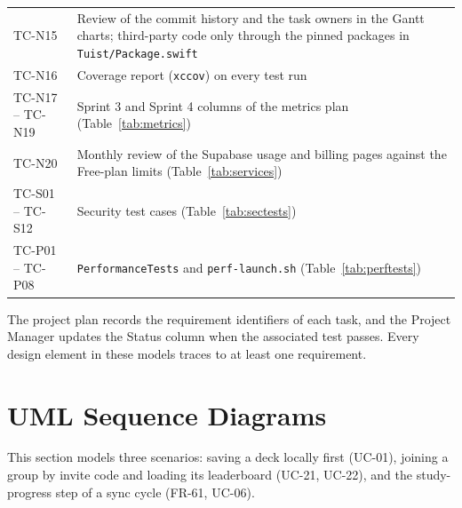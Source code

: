 \documentclass[12pt,letterpaper]{article}
\begin{document}
\begin{xltabular}{\textwidth}{@{}L{2.4cm} Y@{}}
TC-N15 & Review of the commit history and the task owners in the Gantt charts; third-party code only through the pinned packages in \texttt{Tuist/Package.swift} \\
TC-N16 & Coverage report (\texttt{xccov}) on every test run \\
TC-N17 -- TC-N19 & Sprint 3 and Sprint 4 columns of the metrics plan (Table~\ref{tab:metrics}) \\
TC-N20 & Monthly review of the Supabase usage and billing pages against the Free-plan limits (Table~\ref{tab:services}) \\
TC-S01 -- TC-S12 & Security test cases (Table~\ref{tab:sectests}) \\
TC-P01 -- TC-P08 & \texttt{PerformanceTests} and \texttt{perf-launch.sh} (Table~\ref{tab:perftests}) \\
\end{xltabular}

The project plan records the requirement identifiers of each task, and the Project
Manager updates the Status column when the associated test passes. Every design element
in these models traces to at least one requirement.

\section{UML Sequence Diagrams}
This section models three scenarios: saving a deck locally first (UC-01), joining a
group by invite code and loading its leaderboard (UC-21, UC-22), and
the study-progress step of a sync cycle (FR-61, UC-06).
\end{document}
